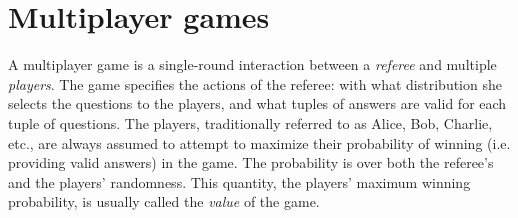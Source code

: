 \documentclass{report}
\theoremstyle{plain}
\theoremstyle{definition}
\theoremstyle{remark}
\numberwithin{equation}{subsection}
\begin{document}
\chapter{Multiplayer games}
\label{chapter:multigames}

A multiplayer game is a single-round interaction between a \emph{referee} and multiple \emph{players}. The game specifies the actions of the referee: with what distribution she selects the questions to the players, and what tuples of answers are valid for each tuple of questions. The players, traditionally referred to as Alice, Bob, Charlie, etc., are always assumed to attempt to maximize their probability of winning (i.e. providing valid answers) in the game. The probability is over both the referee's and the players' randomness. This quantity, the players' maximum winning probability, is usually called the \emph{value} of the game.
\end{document}
